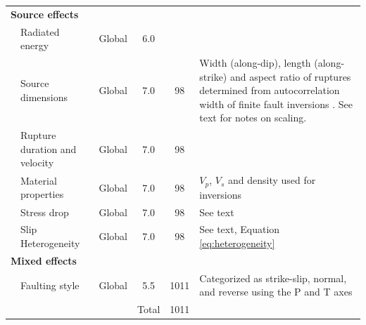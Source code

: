 \documentclass[draft, jgrga]{agujournal2018}
\begin{document}
\begin{table}[]
\begin{threeparttable}
\begin{tabular}{@{}lp{2cm}p{1cm}ccp{6.5cm}@{}}
\multicolumn{2}{l}{\textbf{Source effects}} &              &       &      &                                                                                                                                                                                                            \\
          & Radiated energy\tnote{5}        & Global       & 6.0   &      &                                                                                                                                                                                                            \\
          & Source dimensions\tnote{6}      & Global       & 7.0   & 98   & Width (along-dip), length (along-strike) and aspect ratio of ruptures determined from autocorrelation width of finite fault inversions \citep[following][]{mai2000}. See text for notes on scaling.                                 \\
          & Rupture duration and velocity\tnote{7}& Global  & 7.0   & 98   &                                                                                                                                                                                                            \\
          & Material properties\tnote{7}    & Global       & 7.0   & 98   & $V_p$, $V_s$ and density used for inversions                                                                                                                                                         \\   
          & Stress drop\tnote{6}            & Global       & 7.0   & 98   & See text                                                                                                                                                                                                  \\
          & Slip Heterogeneity\tnote{6}          & Global       & 7.0   & 98   & See text, Equation \ref{eq:heterogeneity}                                                                                                                                                                                                   \\
\multicolumn{2}{l}{\textbf{Mixed effects}}  &              &       &      &                                                                                                                                                                                                            \\
          & Faulting style\tnote{8}         & Global       & 5.5   & 1011 & Categorized as strike-slip, normal, and reverse using the P and T axes                                                                                                                                     \\ \midrule
          &                                 &              & Total & 1011 &                                                
\end{tabular}%


\end{threeparttable}
\end{table}
\end{document}
